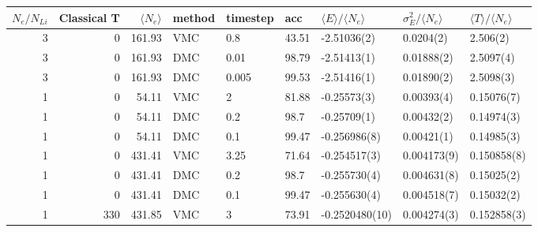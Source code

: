 \begin{tabular}{rrrllllll}
\toprule
 $N_e/N_{Li}$ &  Classical T &  $\langle N_e\rangle$ & method & timestep &    acc & $\langle E\rangle/\langle N_e\rangle$ & $\sigma_E^2/\langle N_e\rangle$ & $\langle T\rangle/\langle N_e\rangle$ \\
\midrule
            3 &            0 &                161.93 &    VMC &      0.8 &  43.51 &                           -2.51036(2) &                       0.0204(2) &                              2.506(2) \\
            3 &            0 &                161.93 &    DMC &     0.01 &  98.79 &                           -2.51413(1) &                      0.01888(2) &                             2.5097(4) \\
            3 &            0 &                161.93 &    DMC &    0.005 &  99.53 &                           -2.51416(1) &                      0.01890(2) &                             2.5098(3) \\
            1 &            0 &                 54.11 &    VMC &        2 &  81.88 &                           -0.25573(3) &                      0.00393(4) &                            0.15076(7) \\
            1 &            0 &                 54.11 &    DMC &      0.2 &   98.7 &                           -0.25709(1) &                      0.00432(2) &                            0.14974(3) \\
            1 &            0 &                 54.11 &    DMC &      0.1 &  99.47 &                          -0.256986(8) &                      0.00421(1) &                            0.14985(3) \\
            1 &            0 &                431.41 &    VMC &     3.25 &  71.64 &                          -0.254517(3) &                     0.004173(9) &                           0.150858(8) \\
            1 &            0 &                431.41 &    DMC &      0.2 &   98.7 &                          -0.255730(4) &                     0.004631(8) &                            0.15025(2) \\
            1 &            0 &                431.41 &    DMC &      0.1 &  99.47 &                          -0.255630(4) &                     0.004518(7) &                            0.15032(2) \\
            1 &          330 &                431.85 &    VMC &        3 &  73.91 &                        -0.2520480(10) &                     0.004274(3) &                           0.152858(3) \\

\end{tabular}
